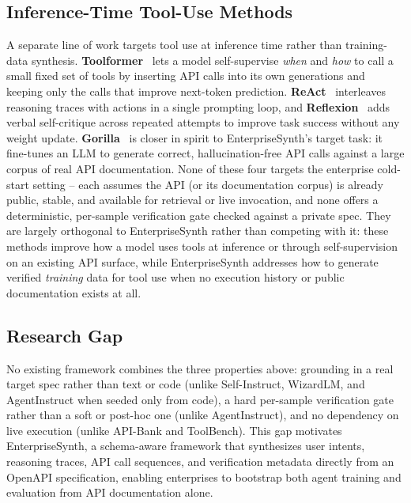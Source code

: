 \documentclass[letterpaper]{article} %
\begin{document}
\subsection{Inference-Time Tool-Use Methods}
A separate line of work targets tool use at inference time rather than training-data synthesis.
\textbf{Toolformer}~\cite{schick2023toolformer} lets a model self-supervise \textit{when} and
\textit{how} to call a small fixed set of tools by inserting API calls into its own generations and
keeping only the calls that improve next-token prediction. \textbf{ReAct}~\cite{yao2023react}
interleaves reasoning traces with actions in a single prompting loop, and
\textbf{Reflexion}~\cite{shinn2023reflexion} adds verbal self-critique across repeated attempts to
improve task success without any weight update. \textbf{Gorilla}~\cite{patil2023gorilla} is closer
in spirit to EnterpriseSynth's target task: it fine-tunes an LLM to generate correct,
hallucination-free API calls against a large corpus of real API documentation. None of these four
targets the enterprise cold-start setting -- each assumes the API (or its documentation corpus) is
already public, stable, and available for retrieval or live invocation, and none offers a
deterministic, per-sample verification gate checked against a private spec. They are largely
orthogonal to EnterpriseSynth rather than competing with it: these methods improve how a model uses
tools at inference or through self-supervision on an existing API surface, while EnterpriseSynth
addresses how to generate verified \textit{training} data for tool use when no execution history or
public documentation exists at all.

\subsection{Research Gap}
No existing framework combines the three properties above: grounding in a real target spec rather
than text or code (unlike Self-Instruct, WizardLM, and AgentInstruct when seeded only from code), a
hard per-sample verification gate rather than a soft or post-hoc one (unlike AgentInstruct), and no
dependency on live execution (unlike API-Bank and ToolBench). This gap motivates EnterpriseSynth, a
schema-aware framework that synthesizes user intents, reasoning traces, API call sequences, and
verification metadata directly from an OpenAPI specification, enabling enterprises to bootstrap
both agent training and evaluation from API documentation alone.
\end{document}
